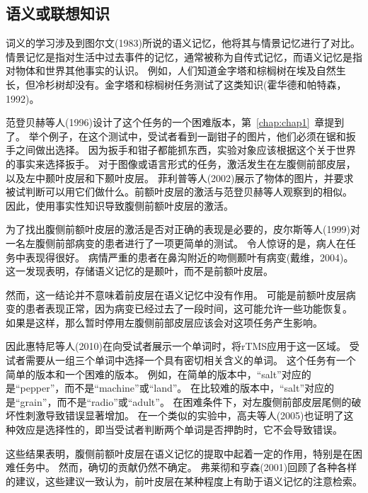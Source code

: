 \subsection{语义或联想知识}
\par
词义的学习涉及到图尔文(1983)所说的语义记忆，他将其与情景记忆进行了对比。
情景记忆是指对生活中过去事件的记忆，通常被称为自传式记忆，而语义记忆是指对物体和世界其他事实的认识。
例如，人们知道金字塔和棕榈树在埃及自然生长，但冷杉树却没有。金字塔和棕榈树任务测试了这类知识(霍华德和帕特森，1992)。
\par


范登贝赫等人(1996)设计了这个任务的一个困难版本，第~\ref{chap:chap1}~章提到了。
举个例子，在这个测试中，受试者看到一副钳子的图片，他们必须在锯和扳手之间做出选择。
因为扳手和钳子都能抓东西，实验对象应该根据这个关于世界的事实来选择扳手。
对于图像或语言形式的任务，激活发生在左腹侧前部皮层，以及左中颞叶皮层和下颞叶皮层。
菲利普等人(2002)展示了物体的图片，并要求被试判断可以用它们做什么。前额叶皮层的激活与范登贝赫等人观察到的相似。
因此，使用事实性知识导致腹侧前额叶皮层的激活。
\par


为了找出腹侧前额叶皮层的激活是否对正确的表现是必要的，皮尔斯等人(1999)对一名左腹侧前部病变的患者进行了一项更简单的测试。
令人惊讶的是，病人在任务中表现得很好。
病情严重的患者在鼻沟附近的吻侧颞叶有病变(戴维，2004)。
这一发现表明，存储语义记忆的是颞叶，而不是前额叶皮层。
\par


然而，这一结论并不意味着前皮层在语义记忆中没有作用。
可能是前额叶皮层病变的患者表现正常，因为病变已经过去了一段时间，这可能允许一些功能恢复。
如果是这样，那么暂时停用左腹侧前部皮层应该会对这项任务产生影响。
\par


因此惠特尼等人(2010)在向受试者展示一个单词时，将rTMS应用于这一区域。
受试者需要从一组三个单词中选择一个具有密切相关含义的单词。
这个任务有一个简单的版本和一个困难的版本。
例如，在简单的版本中，“salt”对应的是“pepper”，而不是“machine”或“land”。
在比较难的版本中，“salt”对应的是“grain”，而不是“radio”或“adult”。
在困难条件下，对左腹侧前部皮层尾侧的破坏性刺激导致错误显著增加。
在一个类似的实验中，高夫等人(2005)也证明了这种效应是选择性的，即当受试者判断两个单词是否押韵时，它不会导致错误。
\par


这些结果表明，腹侧前额叶皮层在语义记忆的提取中起着一定的作用，特别是在困难任务中。
然而，确切的贡献仍然不确定。
弗莱彻和亨森(2001)回顾了各种各样的建议，这些建议一致认为，前叶皮层在某种程度上有助于语义记忆的注意检索。
\par


